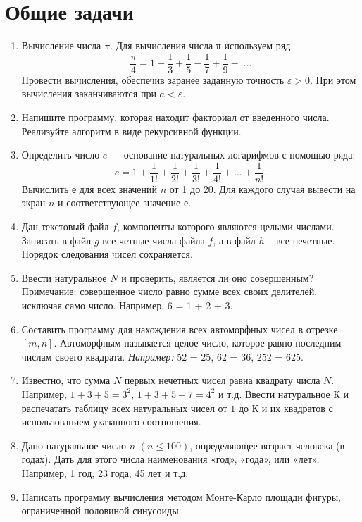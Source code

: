 \chapter{Общие задачи}
\begin{enumerate}[leftmargin=*]
    \item Вычисление числа $\pi$. Для вычисления числа π используем ряд
    \begin{equation*}
        \frac{\pi}{4}=1-\frac{1}{3}+\frac{1}{5}-\frac{1}{7}+\frac{1}{9}-\dots .
    \end{equation*}
    Провести вычисления, обеспечив заранее заданную точность $\varepsilon>0$. При этом вычисления заканчиваются при $a < \varepsilon$.
    \item Напишите программу, которая находит факториал от введенного числа. Реализуйте алгоритм в виде рекурсивной функции.
    \item Определить число $e$ --- основание натуральных логарифмов с помощью ряда:
    \begin{equation*}
        e=1+\frac{1}{1!}+\frac{1}{2!}+\frac{1}{3!}+\frac{1}{4!}+\dots+\frac{1}{n!} .
    \end{equation*}
    Вычислить $е$ для всех значений $n$ от 1 до 20. Для каждого случая вывести на экран $n$ и соответствующее значение $е$.
    \item Дан текстовый файл $f$, компоненты которого являются целыми числами. Записать в файл $g$ все четные числа файла $f$, а в файл $h$ – все нечетные. Порядок следования чисел сохраняется.
    \item Ввести натуральное $N$ и проверить, является ли оно совершенным? Примечание: совершенное число равно сумме всех своих делителей, исключая само число. Например, 6 = 1 + 2 + 3.
    \item Составить программу для нахождения всех автоморфных чисел в отрезке $[m, n]$. Автоморфным называется целое число, которое равно последним числам своего квадрата. 
    \textit{Например:} 52 = 25, 62 = 36, 252 = 625.
    \item Известно, что сумма $N$ первых нечетных чисел равна квадрату числа $N$. Например, $1+3+5=3^2$, $1+3+5+7=4^2$ и т.д. Ввести натуральное К и распечатать таблицу всех натуральных чисел от $1$ до $К$ и их квадратов с использованием указанного соотношения.
    \item Дано натуральное число $n$ $(n≤100)$, определяющее возраст человека (в годах). Дать для этого числа наименования «год», «года», или «лет». Например, 1 год, 23 года, 45 лет и т.д.
    \item Написать программу вычисления методом Монте-Карло площади фигуры, ограниченной половиной синусоиды.

\end{enumerate}
